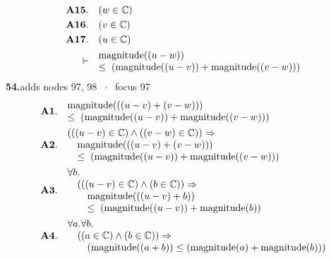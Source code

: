 \documentclass[11pt]{article}
\theoremstyle{plain}
\newcommand{\fit}[1]{\resizebox{\ifdim\width>\linewidth\linewidth\else\width\fi}{!}{#1}}
\begin{document}
\begin{align*}
  \mathbf{A15.}\quad & (w \in \mathbb{C}) \\
  \mathbf{A16.}\quad & (v \in \mathbb{C}) \\
  \mathbf{A17.}\quad & (u \in \mathbb{C}) \\
  \vdash\quad & \begin{array}{@{}l@{}} \operatorname{magnitude}((u - w)) \\ \leq\; (\operatorname{magnitude}((u - v)) + \operatorname{magnitude}((v - w))) \end{array}
\end{align*}
\medskip\noindent\textbf{54.}\quad \fit{\texttt{(cut '(= (- u w) (+ (- u v) (- v w))))}}\hfill{\small adds nodes 97, 98 $\;\cdot\;$ focus 97}\\[2pt]
\begin{align*}
  \mathbf{A1.}\quad & \begin{array}{@{}l@{}} \operatorname{magnitude}(((u - v) + (v - w))) \\ \leq\; (\operatorname{magnitude}((u - v)) + \operatorname{magnitude}((v - w))) \end{array} \\
  \mathbf{A2.}\quad & \begin{array}{@{}l@{}} (((u - v) \in \mathbb{C}) \wedge ((v - w) \in \mathbb{C})) \Rightarrow  \\ \quad \operatorname{magnitude}(((u - v) + (v - w))) \\ \quad \leq\; (\operatorname{magnitude}((u - v)) + \operatorname{magnitude}((v - w))) \end{array} \\
  \mathbf{A3.}\quad & \begin{array}{@{}l@{}} \forall b. \\ \quad (((u - v) \in \mathbb{C}) \wedge (b \in \mathbb{C})) \Rightarrow  \\ \quad \quad \operatorname{magnitude}(((u - v) + b)) \\ \quad \quad \leq\; (\operatorname{magnitude}((u - v)) + \operatorname{magnitude}(b)) \end{array} \\
  \mathbf{A4.}\quad & \begin{array}{@{}l@{}} \forall a. \forall b. \\ \quad ((a \in \mathbb{C}) \wedge (b \in \mathbb{C})) \Rightarrow  \\ \quad \quad (\operatorname{magnitude}((a + b)) \leq (\operatorname{magnitude}(a) + \operatorname{magnitude}(b))) \end{array} \\

\end{align*}
\end{document}
